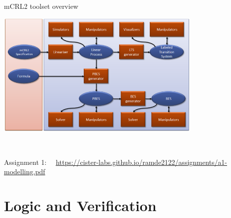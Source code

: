 \documentclass[aspectratio=169]{beamer}
\begin{document}
\begin{slide}{mCRL2 toolset overview}
  \centering
  
  \includegraphics[width=0.75\textwidth]{images/mcrl2-toolset.png}

  \\[-10mm]
  \begin{block}{}\centering
    Assignment 1:~~
  \mbox{\alert{\footnotesize\url{https://cister-labs.github.io/ramde2122/assignments/a1-modelling.pdf}}}
  \end{block}

\end{slide}



\section{Logic and Verification}
\end{document}

